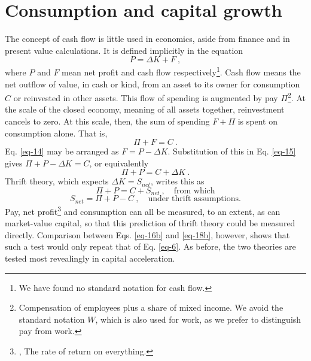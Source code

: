 \documentclass[a4paper,fleqn]{latex_styles/cas-sc}
\begin{document}
%

\FloatBarrier
%
\hypertarget{consumption-and-capital-growth}{%
\section{Consumption and capital growth}\label{consumption-and-capital-growth}}
%
The concept of cash flow is little used in economics, aside from finance and in present value calculations. It is defined implicitly in the equation
%
\begin{equation}
    P = \Delta K + F\ ,\label{eq-14}
\end{equation}
%
where \(P\) and \(F\) mean net profit and cash flow respectively\footnote{We have found no standard notation for cash flow.}. Cash flow means the net outflow of value, in cash or kind, from an asset to its owner for consumption \(C\) or reinvested in other assets. This flow of spending is augmented by pay \(\Pi\)\footnote{Compensation of employees plus a share of mixed income. We avoid the standard notation \(W\), which is also used for work, as we prefer to distinguish pay from work.}. At the scale of the closed economy, meaning of all assets together, reinvestment cancels to zero. At this scale, then, the sum of spending \(F + \Pi\) is spent on consumption alone. That is,
%
\begin{equation}
    \Pi + F = C\ .\label{eq-15}
\end{equation}
%
Eq. \eqref{eq-14} may be arranged as \(F = P - \Delta K\). Substitution of this in Eq. \eqref{eq-15} gives \(\Pi + P - \Delta K = C\), or equivalently
%
\begin{equation}
   \Pi + P = C + \Delta K\ .\label{eq-16b}
\end{equation}
%
Thrift theory, which expects \(\Delta K = S_{net}\), writes this as
%
\begin{equation}
    \Pi + P = C + S_{net}\ ,\quad \text{from which}\label{eq-17b}
\end{equation}
\vspace{-5ex}
\begin{equation}
    S_{net} = \Pi + P - C\ ,\quad \text{under thrift assumptions.}\label{eq-18b}
\end{equation}
%
Pay, net profit\footnote{\cite{jorda2019}, The rate of return on everything.} and consumption can all be measured, to an extent, as can market-value capital, so that this prediction of thrift theory could be measured directly. Comparison between Eqs. \eqref{eq-16b} and \eqref{eq-18b}, however, shows that such a test would only repeat that of Eq. \eqref{eq-6}. As before, the two theories are tested most revealingly in capital acceleration. 
\end{document}
